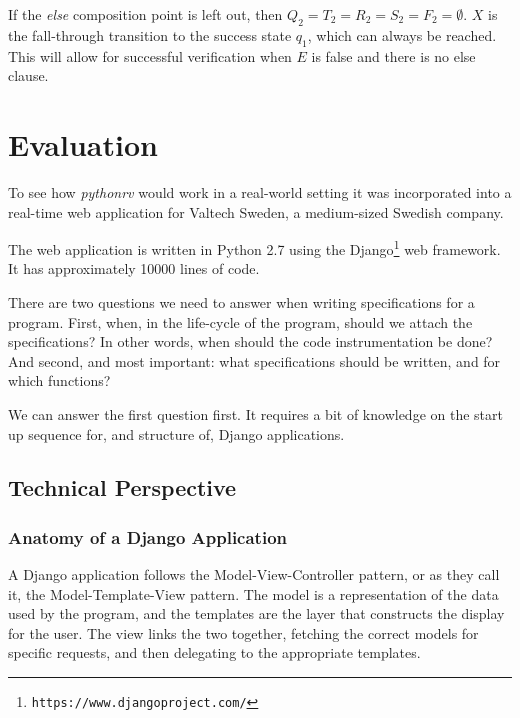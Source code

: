 \documentclass[a4paper,11pt]{kth-mag}
\begin{document}
If the \textit{else} composition point is left out, then $Q_2 = T_2 = R_2 = S_2
= F_2 = \emptyset$. $X$ is the fall-through transition to the success state
$q_1$, which can always be reached. This will allow for successful verification
when $E$ is false and there is no else clause.










\pagestyle{newchap}
\chapter{Evaluation} \label{chapter-evaluation}

To see how \textit{pythonrv} would work in a real-world setting it was
incorporated into a real-time web application for Valtech Sweden, a
medium-sized Swedish company.

The web application is written in Python 2.7 using the
Django\footnote{\texttt{https://www.djangoproject.com/}} web framework. It has
approximately 10000 lines of code.

There are two questions we need to answer when writing specifications for a
program. First, when, in the life-cycle of the program, should we attach the
specifications? In other words, when should the code instrumentation be done?
And second, and most important: what specifications should be written, and for
which functions?

We can answer the first question first. It requires a bit of knowledge on the
start up sequence for, and structure of, Django applications.


\section{Technical Perspective}


\subsection{Anatomy of a Django Application}

A Django application follows the Model-View-Controller pattern, or as they call
it, the Model-Template-View pattern. The model is a representation of the data
used by the program, and the templates are the layer that constructs the
display for the user. The view links the two together, fetching the correct
models for specific requests, and then delegating to the appropriate templates.
\end{document}
